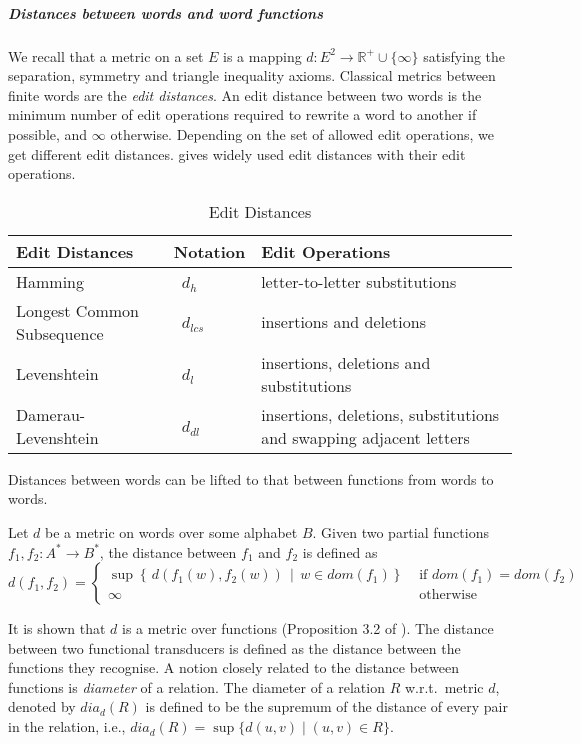 \documentclass[a4paper,UKenglish,cleveref, autoref, thm-restate,authorcolumns, colorlinks]{lipics-v2021}
\newcommand\dom{\mathit{dom}}
\newcommand\dia[2]{\ensuremath{\mathit{dia}_{#2}(#1)}}
\newcommand{\dlev}{\ensuremath{d_l}}
\begin{document}
\subparagraph{Distances between words and word functions} We recall that a metric on a set $E$ is a mapping
$d : E^2\rightarrow\mathbb{R}^+\cup \{\infty\}$ satisfying the separation, symmetry and triangle inequality axioms. 
Classical metrics between finite words are 
the \emph{edit distances}.
An edit distance between two words is the minimum number of edit operations required to rewrite a word to another if possible, and $\infty$ otherwise. Depending on the set of allowed edit operations, we get different edit distances.
 gives widely used edit distances with their edit operations.

\begin{table}[h!]
\centering 
\begin{tabular}{|p{4.8cm}|p{1.2cm}|p{6cm}|}
\hline
Edit Distances & Notation & Edit Operations \\
\hline
Hamming   & \ $d_h$   & letter-to-letter substitutions   \\
Longest Common Subsequence   & \ $d_{lcs}$   & insertions and deletions   \\
Levenshtein   & \ $\dlev$   & insertions, deletions and substitutions   \\
Damerau-Levenshtein   & \ $d_{dl}$   & insertions, deletions, substitutions and swapping adjacent letters   \\
\hline
\end{tabular}
\caption{Edit Distances \cite{editdistance}}
\label{table:editdistance}
\end{table}

Distances between words can be lifted to that between functions from words to words.
\begin{definition}\label{def:distfunc}
 Let $d$ be a metric on words over some alphabet $B$. Given two partial functions $f_1,f_2: A^* \rightarrow B^*$, the distance between $f_1$ and $f_2$ is defined as 
$$d(f_1,f_2) = \begin{cases} \sup \left \{\,  d(f_1(w), f_2(w)) \,\mid\,  w \in \dom(f_1) \right \} & \text{ if $\dom(f_1) = \dom(f_2)$} \\
 \infty & \text{ otherwise } 
 \end{cases}$$
\end{definition}

It is shown that $d$ is a metric over functions (Proposition 3.2 of \cite{editdistance}). 
The distance between two functional transducers is defined as the distance between the functions they recognise. A notion closely related to the distance between functions is \emph{diameter} of a relation. The diameter of a relation $R$ w.r.t.~metric $d$, denoted by $\dia{R}{d}$ is defined to be the supremum of the distance of every pair in the relation, i.e.,
$\dia{R}{d} = \sup \{d(u,v) \mid (u,v) \in R\}$.
\end{document}

